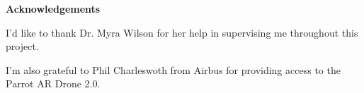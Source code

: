 \thispagestyle{empty}

\begin{center}
    {\LARGE\bf Acknowledgements}
\end{center}

I'd like to thank Dr. Myra Wilson for her help in supervising me throughout this project.

I'm also grateful to Phil Charleswoth from Airbus for providing access to the Parrot AR Drone 2.0.
